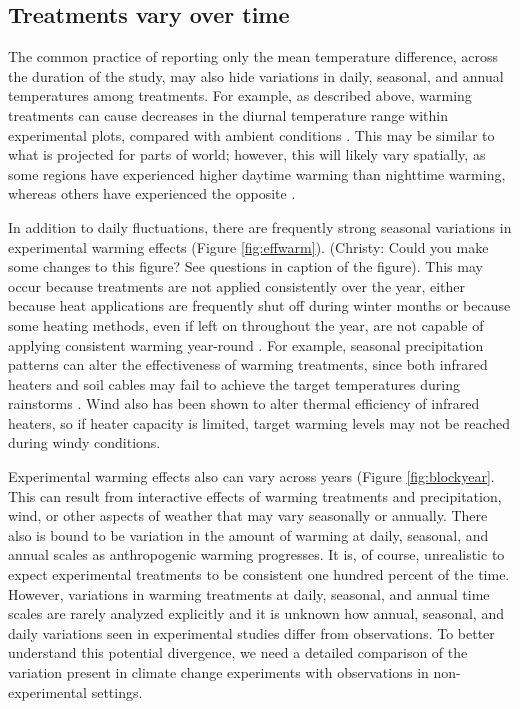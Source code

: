 \documentclass{article}
\begin{document}
\subsection* {Treatments vary over time}
The common practice of reporting only the mean temperature difference, across the duration of the study, may also hide variations in daily, seasonal, and annual temperatures among treatments. For example, as described above, warming treatments can cause decreases in the diurnal temperature range within experimental plots, compared with ambient conditions \citep{hoeppner2012}. %
This may be similar to what is projected for parts of world; however, this will likely vary spatially, as some regions have experienced higher daytime warming than nighttime warming, whereas others have experienced the opposite \citep{ipcc2013}. 

\par In addition to daily fluctuations, there are frequently strong seasonal variations in experimental warming effects (Figure \ref{fig:effwarm}). (Christy: Could you make some changes to this figure? See questions in caption of the figure). This may occur because treatments are not applied consistently over the year, either because heat applications are frequently shut off during winter months or because some heating methods, even if left on throughout the year, are not capable of applying consistent warming year-round \citep[e.g.][]{clark2014a,clark2014b,hagedorn2010}. For example, seasonal precipitation patterns can alter the effectiveness of warming treatments, since both infrared heaters and soil cables may fail to achieve the target temperatures during  rainstorms \citep{peterjohn1993,hoeppner2012}. Wind also has been shown to alter thermal efficiency of infrared heaters, so if heater capacity is limited, target warming levels may not be reached during windy conditions\citep{kimball2005,kimball2008}.

\par Experimental warming effects also can vary across years (Figure \ref{fig:blockyear}. This can result from interactive effects of warming treatments and precipitation, wind, or other aspects of weather that may vary seasonally or annually. There also is bound to be variation in the amount of warming at daily, seasonal, and annual scales as anthropogenic warming progresses. It is, of course, unrealistic to expect experimental treatments to be consistent one hundred percent of the time. However, variations in warming treatments at daily, seasonal, and annual time scales are rarely analyzed explicitly and it is unknown how annual, seasonal, and daily variations seen in experimental studies differ from observations. To better understand this potential divergence, we need a detailed comparison of the variation present in climate change experiments with observations in non-experimental settings. 
\end{document}
